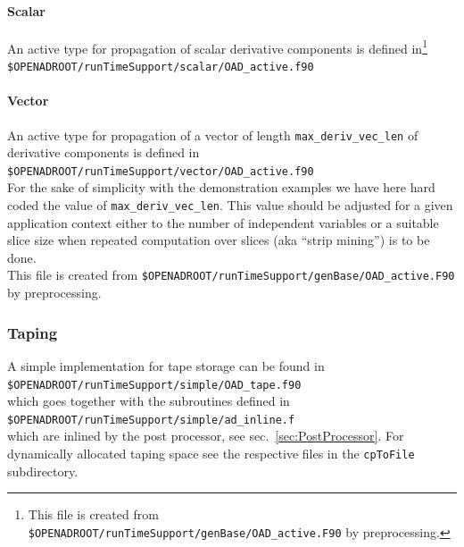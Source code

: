 \documentclass{book}
\newcommand{\refsec}[1]{{sec.~\ref{#1}}}
\begin{document}
\paragraph{Scalar}
An active type for propagation of scalar derivative components is defined in\footnote{
This file is created from \lstinline{$OPENADROOT/runTimeSupport/genBase/OAD_active.F90} %
by preprocessing.
} \\[1ex]
\hspace*{.3cm}\lstinline{$OPENADROOT/runTimeSupport/scalar/OAD_active.f90}%
\paragraph{Vector}
An active type for propagation of a vector of length 
\lstinline{max_deriv_vec_len} of derivative components is defined in\footnotemark[\value{footnote}] \\[1ex]
\hspace*{.3cm}\lstinline{$OPENADROOT/runTimeSupport/vector/OAD_active.f90}\\[1ex] %
For the sake of simplicity with the demonstration examples 
we have here hard coded the value of \lstinline{max_deriv_vec_len}.  
This value should be adjusted for a given application context either to the number of independent 
variables or a suitable slice size when repeated computation over slices (aka ``strip mining'') 
is to be done.\\
This file is created from \lstinline{$OPENADROOT/runTimeSupport/genBase/OAD_active.F90} %
by preprocessing.

\subsubsection{Taping}
A simple implementation for  tape storage can be found in \\[1ex]
\hspace*{.3cm}\lstinline{$OPENADROOT/runTimeSupport/simple/OAD_tape.f90}\\[1ex] %
which goes together with the subroutines defined in \\[1ex]
\hspace*{.3cm}\lstinline{$OPENADROOT/runTimeSupport/simple/ad_inline.f}\\[1ex] %
which are inlined by the post processor, see \refsec{sec:PostProcessor}.
For dynamically allocated taping space see the respective files in the \lstinline{cpToFile}
subdirectory.
\end{document}
